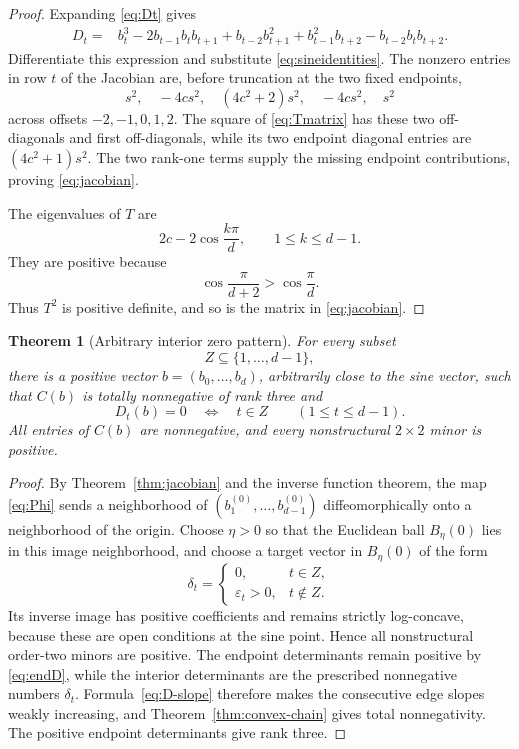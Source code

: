 \documentclass{amsart}
\numberwithin{equation}{section}
\newtheorem{theorem}{Theorem}
\theoremstyle{definition}
\theoremstyle{remark}
\begin{document}
\begin{proof}
Expanding \eqref{eq:Dt} gives
\begin{align}\label{eq:Dpolynomial}
 D_t={}&b_t^3-2b_{t-1}b_tb_{t+1}
      +b_{t-2}b_{t+1}^2+b_{t-1}^2b_{t+2}
      -b_{t-2}b_tb_{t+2}.
\end{align}
Differentiate this expression and substitute \eqref{eq:sineidentities}.  The nonzero entries in row $t$ of the Jacobian are, before truncation at the two fixed endpoints,
\begin{equation}\label{eq:jacentries}
 s^2,
 \quad -4cs^2,
 \quad (4c^2+2)s^2,
 \quad -4cs^2,
 \quad s^2
\end{equation}
across offsets $-2,-1,0,1,2$.  The square of \eqref{eq:Tmatrix} has these two off-diagonals and first off-diagonals, while its two endpoint diagonal entries are $(4c^2+1)s^2$.  The two rank-one terms supply the missing endpoint contributions, proving \eqref{eq:jacobian}.

The eigenvalues of $T$ are
\begin{equation}\label{eq:Teigen}
 2c-2\cos\frac{k\pi}{d},
 \qquad 1\le k\le d-1.
\end{equation}
They are positive because
\[
 \cos\frac{\pi}{d+2}>\cos\frac{\pi}{d}.
\]
Thus $T^2$ is positive definite, and so is the matrix in \eqref{eq:jacobian}.
\end{proof}

\begin{theorem}[Arbitrary interior zero pattern]\label{thm:arbitrary-Z}
For every subset
\[
 Z\subseteq\{1,\ldots,d-1\},
\]
there is a positive vector $b=(b_0,\ldots,b_d)$, arbitrarily close to the sine vector, such that $C(b)$ is totally nonnegative of rank three and
\begin{equation}\label{eq:Zpattern}
 D_t(b)=0
 \quad\Longleftrightarrow\quad
 t\in Z
 \qquad(1\le t\le d-1).
\end{equation}
All entries of $C(b)$ are nonnegative, and every nonstructural $2\times2$ minor is positive.
\end{theorem}

\begin{proof}
By Theorem~\ref{thm:jacobian} and the inverse function theorem, the map \eqref{eq:Phi} sends a neighborhood of $(b_1^{(0)},\ldots,b_{d-1}^{(0)})$ diffeomorphically onto a neighborhood of the origin.  Choose $\eta>0$ so that the Euclidean ball $B_\eta(0)$ lies in this image neighborhood, and choose a target vector in $B_\eta(0)$ of the form
\[
 \delta_t=
 \begin{cases}
 0,&t\in Z,\\
 \varepsilon_t>0,&t\notin Z.
 \end{cases}
\]
Its inverse image has positive coefficients and remains strictly log-concave, because these are open conditions at the sine point.  Hence all nonstructural order-two minors are positive.  The endpoint determinants remain positive by \eqref{eq:endD}, while the interior determinants are the prescribed nonnegative numbers $\delta_t$.  Formula~\eqref{eq:D-slope} therefore makes the consecutive edge slopes weakly increasing, and Theorem~\ref{thm:convex-chain} gives total nonnegativity.  The positive endpoint determinants give rank three.
\end{proof}
\end{document}
